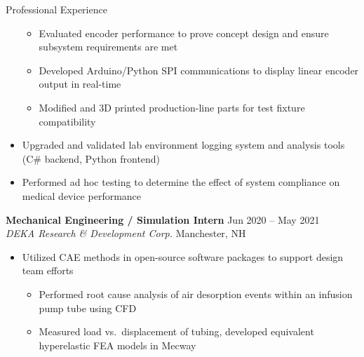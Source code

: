\documentclass{resume}
\begin{document}
\begin{rSection}{Professional Experience}
\begin{itemize}[label={\tiny\raisebox{1ex}{\textbullet}}, noitemsep]
              \begin{itemize}[label={\tiny\raisebox{1ex}{\textbullet}}, noitemsep]
                  \item Evaluated encoder performance to prove concept design and ensure subsystem requirements are met
                  \item Developed Arduino/Python SPI communications to display linear encoder output in real-time
                  \item Modified and 3D printed production-line parts for test fixture compatibility
              \end{itemize}
        \item Upgraded and validated lab environment logging system and analysis tools (C\# backend, Python frontend)
        \item Performed ad hoc testing to determine the effect of system compliance on medical device performance
    \end{itemize}
    \vspace{-0.4em}
    {\bf Mechanical Engineering / Simulation Intern} \hfill {Jun 2020 -- May 2021}
    \\ {\em DEKA Research \& Development Corp.} \hfill {Manchester, NH}
    \vspace{-0.5em}
    \begin{itemize}[label={\tiny\raisebox{1ex}{\textbullet}}, noitemsep]
        \item Utilized CAE methods in open-source software packages to support design team efforts
              \begin{itemize}[label={\tiny\raisebox{1ex}{\textbullet}}, noitemsep]
                  \item Performed root cause analysis of air desorption events within an infusion pump tube using CFD
                  \item Measured load vs.\ displacement of tubing, developed equivalent hyperelastic FEA models in Mecway
              \end{itemize}{}
    \end{itemize}{}
    \vspace{-0.4em}
\end{rSection}
\end{document}
